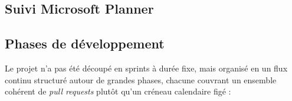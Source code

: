 \documentclass[12pt, a4paper]{report}
\renewcommand{\_}{\origunderscore\allowbreak}
\begin{document}
\subsection{Suivi Microsoft Planner}





\subsection{Phases de développement}

Le projet n'a pas été découpé en sprints à durée fixe, mais organisé en un flux continu structuré autour de grandes phases, chacune couvrant un ensemble cohérent de \textit{pull requests} plutôt qu'un créneau calendaire figé :
\end{document}
